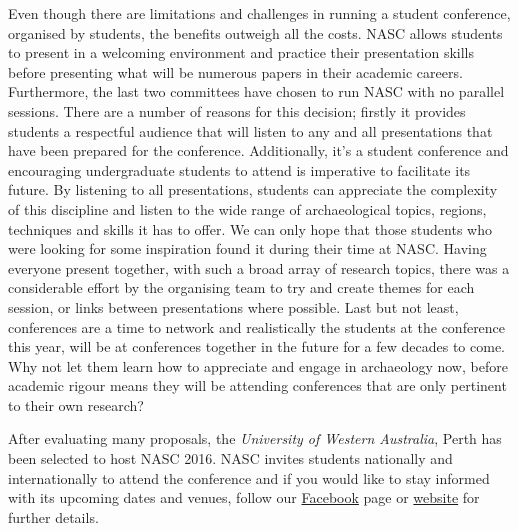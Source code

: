 Even though there are limitations and challenges in running a student conference, organised by students, the benefits outweigh all the costs. NASC allows students to present in a welcoming environment and practice their presentation skills before presenting what will be numerous papers in their academic careers. Furthermore, the last two committees have chosen to run NASC with no parallel sessions. There are a number of reasons for this decision; firstly it provides students a respectful audience that will listen to any and all presentations that have been prepared for the conference. Additionally, it’s a student conference and encouraging undergraduate students to attend is imperative to facilitate its future. By listening to all presentations, students can appreciate the complexity of this discipline and listen to the wide range of archaeological topics, regions, techniques and skills it has to offer. We can only hope that those students who were looking for some inspiration found it during their time at NASC. Having everyone present together, with such a broad array of research topics, there was a considerable effort by the organising team to try and create themes for each session, or links between presentations where possible. Last but not least, conferences are a time to network and realistically the students at the conference this year, will be at conferences together in the future for a few decades to come. Why not let them learn how to appreciate and engage in archaeology now, before academic rigour means they will be attending conferences that are only pertinent to their own research? 

After evaluating many proposals, the \emph{University of Western Australia}, Perth has been selected to host NASC 2016. NASC invites students nationally and internationally to attend the conference and if you would like to stay informed with its upcoming dates and venues, follow our \href{https://www.facebook.com/nascaustralia}{Facebook} page or \href{http://www.nascaustralia.com/}{website} for further details.




	\label{NASC:lastpage}
\closingarticle
